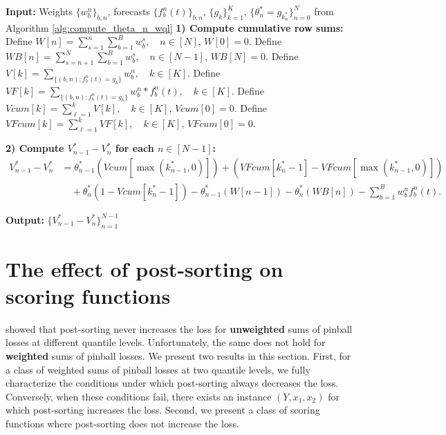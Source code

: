 \begin{algorithm}[h]
  \caption{Efficient computation of $V_{n-1}^* - V_n^*$ for all $n \in [N-1]$}
  \label{alg:compute_vn_diff_wql}
  \begin{algorithmic}[1]
  \State \textbf{Input:} Weights $\{w_b^n\}_{b,n}$, forecasts $\{f_b^n(t)\}_{b,n}$, $\{g_k\}_{k=1}^K$, $\{\theta_n^* = g_{k_n^*}\}_{n=0}^N$ from Algorithm \ref{alg:compute_theta_n_wql}
  \State \textbf{1) Compute cumulative row sums:}
  \State Define $W[n] = \sum_{s=1}^{n} \sum_{b=1}^B w_b^s, \quad n \in [N]$, $W[0] = 0$.
  \State Define $WB[n] = \sum_{s=n+1}^N \sum_{b=1}^B w_b^s, \quad n \in [N-1]$, $WB[N] = 0$. \smallskip
  \State Define $V[k] = \sum_{\{(b,n): f_b^n(t) = g_k\}} w_b^n, \quad k \in [K]$.
  \State Define $VF[k] = \sum_{\{(b,n): f_b^n(t) = g_k\}} w_b^n * f_b^n(t), \quad k \in [K]$.
  \State Define $Vcum[k] = \sum_{\ell=1}^{k} V[k], \quad k \in [K]$, $Vcum[0] = 0$.
  \State Define $VFcum[k] = \sum_{\ell=1}^{k} VF[k], \quad k \in [K]$, $VFcum[0] = 0$. \smallskip

  \State \textbf{2) Compute $V_{n-1}^* - V_n^*$ for each $n \in [N-1]$:}
    \begin{align*}
      V_{n-1}^* - V_n^* 
      & = \theta_{n-1}^* (Vcum[\max(k_{n-1}^*,0)]) + (VFcum[k_n^*-1] - VFcum[\max(k_{n-1}^*,0)]) \\
      & \quad + \theta_n^* (1- Vcum[k_n^*-1]) - \theta_{n-1}^* (W[n-1]) - \theta_n^* (WB[n]) - \sum_{b=1}^B w_b^n f_b^n(t).  
    \end{align*}
    
  \EndFor
  \State \textbf{Output:} $\{V_{n-1}^* - V_n^*\}_{n=1}^{N-1}$
  \end{algorithmic}
\end{algorithm}







\section{The effect of post-sorting on scoring functions} \label{appsec:post_sorting}

\cite{fakoor2023flexible} showed that post-sorting never increases the loss for \textbf{unweighted} sums of pinball losses at different quantile levels. Unfortunately, the same does not hold for \textbf{weighted} sums of pinball losses. We present two results in this section. First, for a class of weighted sums of pinball losses at two quantile levels, we fully characterize the conditions under which post-sorting always decreases the loss. Conversely, when these conditions fail, there exists an instance $(Y, x_1, x_2)$ for which post-sorting increases the loss. Second, we present a class of scoring functions where post-sorting does not increase the loss.

